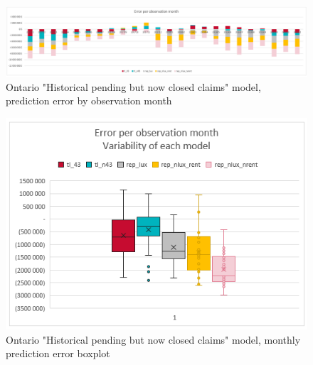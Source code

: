 		\begin{figure}[H]
			\begin{center}
				\includegraphics[scale=0.4]{Graphiques/ON_closedonly_model_by_month} 
				\renewcommand{\figurename}{Figure}
				\caption[Ontario version two model error]{Ontario "Historical pending but now closed claims" model, prediction error by observation month}\label{Fig_ON_closedonly_er_by_month}
			\end{center}
		\end{figure}
		\begin{figure}[H]
			\begin{center}
				\includegraphics[scale=0.4]{Graphiques/ON_closedonly_model_mustach} 
				\renewcommand{\figurename}{Figure}
				\caption[Ontario version two model error - boxplot]{Ontario "Historical pending but now closed claims" model, monthly prediction error boxplot}\label{Fig_ON_closedonly_er_boxplot}
			\end{center}
		\end{figure}


